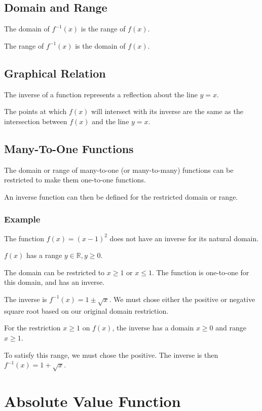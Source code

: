 \documentclass[a4paper,11pt]{article}
\begin{document}
\subsection{Domain and Range}

The domain of $f^{-1}(x)$ is the range of $f(x)$.

The range of $f^{-1}(x)$ is the domain of $f(x)$.


\subsection{Graphical Relation}

The inverse of a function represents a reflection about the line $y = x$.

The points at which $f(x)$ will intersect with its inverse are the same as the
intersection between $f(x)$ and the line $y = x$.


\subsection{Many-To-One Functions}

The domain or range of many-to-one (or many-to-many) functions can be
restricted to make them one-to-one functions.

An inverse function can then be defined for the restricted domain or range.


\subsubsection{Example}

The function $f(x) = (x - 1)^2$ does not have an inverse for its natural domain.

$f(x)$ has a range $y \in \mathbb{R}, y \geq 0$.

The domain can be restricted to $x \geq 1$ or $x \leq 1$. The function is
one-to-one for this domain, and has an inverse.

The inverse is $f^{-1}(x) = 1 \pm \sqrt{x}$. We must chose either the positive
or negative square root based on our original domain restriction.

For the restriction $x \geq 1$ on $f(x)$, the inverse has a domain $x \geq 0$
and range $x \geq 1$.

To satisfy this range, we must chose the positive. The inverse is then
$f^{-1}(x) = 1 + \sqrt{x}$.




\section{Absolute Value Function}
\end{document}
